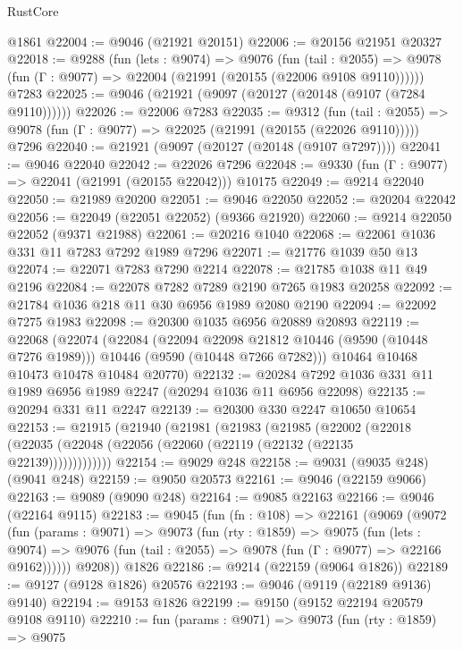 \begin{lexlean}{RustCore}
\begin{coremodule}
    @1861
@22004 := @9046 (@21921 @20151)
@22006 := @20156 @21951 @20327
@22018 := @9288
    (fun (lets : @9074) =>
    @9076
      (fun (tail : @2055) =>
      @9078 (fun (Γ : @9077) => @22004 (@21991 (@20155 (@22006 @9108 @9110))))))
    @7283
@22025 := @9046 (@21921 (@9097 (@20127 (@20148 (@9107 (@7284 @9110))))))
@22026 := @22006 @7283
@22035 := @9312
    (fun (tail : @2055) => @9078 (fun (Γ : @9077) => @22025 (@21991 (@20155 (@22026 @9110)))))
    @7296
@22040 := @21921 (@9097 (@20127 (@20148 (@9107 @7297))))
@22041 := @9046 @22040
@22042 := @22026 @7296
@22048 := @9330 (fun (Γ : @9077) => @22041 (@21991 (@20155 @22042))) @10175
@22049 := @9214 @22040
@22050 := @21989 @20200
@22051 := @9046 @22050
@22052 := @20204 @22042
@22056 := @22049 (@22051 @22052) (@9366 @21920)
@22060 := @9214 @22050 @22052 (@9371 @21988)
@22061 := @20216 @1040
@22068 := @22061 @1036 @331 @11 @7283 @7292 @1989 @7296
@22071 := @21776 @1039 @50 @13
@22074 := @22071 @7283 @7290 @2214
@22078 := @21785 @1038 @11 @49 @2196
@22084 := @22078 @7282 @7289 @2190 @7265 @1983 @20258
@22092 := @21784 @1036 @218 @11 @30 @6956 @1989 @2080 @2190
@22094 := @22092 @7275 @1983
@22098 := @20300 @1035 @6956 @20889 @20893
@22119 := @22068
    (@22074
      (@22084
        (@22094 @22098 @21812 @10446 (@9590 (@10448 @7276 @1989)))
        @10446
        (@9590 (@10448 @7266 @7282)))
      @10464
      @10468
      @10473
      @10478
      @10484
      @20770)
@22132 := @20284 @7292 @1036 @331 @11 @1989 @6956 @1989 @2247 (@20294 @1036 @11 @6956 @22098)
@22135 := @20294 @331 @11 @2247
@22139 := @20300 @330 @2247 @10650 @10654
@22153 := @21915
    (@21940
      (@21981
        (@21983
          (@21985
            (@22002
              (@22018 (@22035 (@22048 (@22056 (@22060 (@22119 (@22132 (@22135 @22139)))))))))))))
@22154 := @9029 @248
@22158 := @9031 (@9035 @248) (@9041 @248)
@22159 := @9050 @20573
@22161 := @9046 (@22159 @9066)
@22163 := @9089 (@9090 @248)
@22164 := @9085 @22163
@22166 := @9046 (@22164 @9115)
@22183 := @9045
    (fun (fn : @108) =>
    @22161
      (@9069
        (@9072
          (fun (params : @9071) =>
          @9073
            (fun (rty : @1859) =>
            @9075
              (fun (lets : @9074) =>
              @9076 (fun (tail : @2055) => @9078 (fun (Γ : @9077) => @22166 @9162))))))
        @9208))
    @1826
@22186 := @9214 (@22159 (@9064 @1826))
@22189 := @9127 (@9128 @1826) @20576
@22193 := @9046 (@9119 (@22189 @9136) @9140)
@22194 := @9153 @1826
@22199 := @9150 (@9152 @22194 @20579 @9108 @9110)
@22210 := fun (params : @9071) =>
  @9073
    (fun (rty : @1859) =>
    @9075

\end{coremodule}
\end{lexlean}

